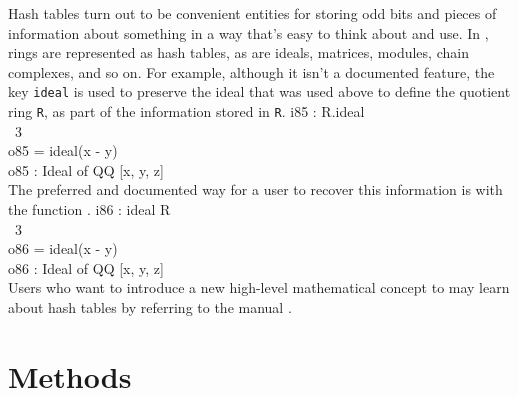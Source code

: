 Hash tables turn out to be convenient entities for storing odd bits and
pieces of information about something in a way that's easy to think about and
use.
In \Mtwo, rings are represented as hash tables, as are ideals, matrices,
modules, chain complexes, and so on.  For example, although it isn't a
documented feature, the key {\tt ideal} is used to preserve the ideal that
was used above to define the quotient ring {\tt R}, as part of the
information stored in {\tt R}.  
\beginOutput
i85 : R.ideal\\
\emptyLine
\             3\\
o85 = ideal(x  - y)\\
\emptyLine
o85 : Ideal of QQ [x, y, z]\\
\endOutput
The preferred and documented way for a user to recover this information is
with the function . 
\beginOutput
i86 : ideal R\\
\emptyLine
\             3\\
o86 = ideal(x  - y)\\
\emptyLine
o86 : Ideal of QQ [x, y, z]\\
\endOutput
Users who want to introduce a new high-level mathematical
concept to \Mtwo may learn about hash tables by referring to the \Mtwo manual
\cite{M2}.

\section{Methods}

